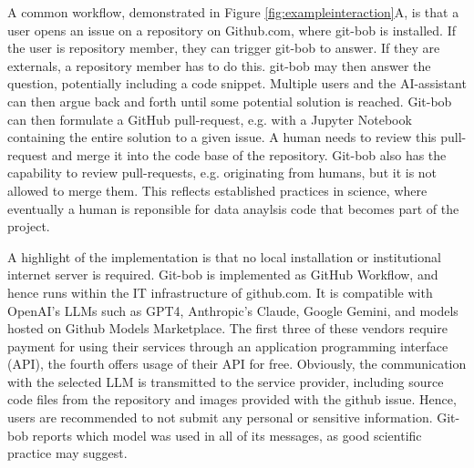 \documentclass{ecai}
\begin{document}

A common workflow, demonstrated in Figure \ref{fig:exampleinteraction}A, is that a user opens an issue on a repository on Github.com, where git-bob is installed. If the user is repository member, they can trigger git-bob to answer. If they are externals, a repository member has to do this. git-bob may then answer the question, potentially including a code snippet. Multiple users and the AI-assistant can then argue back and forth until some potential solution is reached. Git-bob can then formulate a GitHub pull-request, e.g. with a Jupyter Notebook containing the entire solution to a given issue. A human needs to review this pull-request and merge it into the code base of the repository. Git-bob also has the capability to review pull-requests, e.g. originating from humans, but it is not allowed to merge them. This reflects established practices in science, where eventually a human is reponsible for data anaylsis code that becomes part of the project.

A highlight of the implementation is that no local installation or institutional internet server is required. Git-bob is implemented as GitHub Workflow, and hence runs within the IT infrastructure of github.com. It is compatible with OpenAI's LLMs such as GPT4, Anthropic's Claude, Google Gemini, and models hosted on Github Models Marketplace. The first three of these vendors require payment for using their services through an application programming interface (API), the fourth offers usage of their API for free. Obviously, the communication with the selected LLM is transmitted to the service provider, including source code files from the repository and images provided with the github issue. Hence, users are recommended to not submit any personal or sensitive information. Git-bob reports which model was used in all of its messages, as good scientific practice may suggest.
\end{document}

